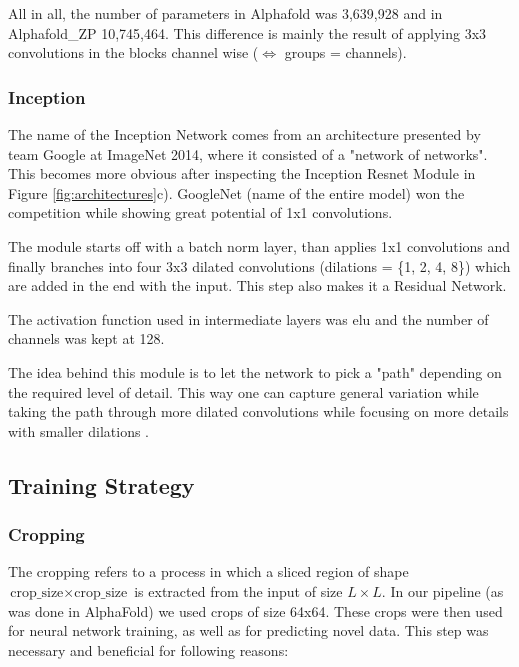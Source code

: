 All in all, the number of parameters in Alphafold was 3,639,928 and in Alphafold\_ZP 10,745,464. This difference is mainly the result of applying 3x3 convolutions in the blocks channel wise ($\Longleftrightarrow$ groups = channels).

\subsubsection{Inception}

The name of the Inception Network %
comes from an architecture presented by team Google at ImageNet 2014, where it consisted of a "network of networks".
This becomes more obvious after inspecting the Inception Resnet Module in Figure \ref{fig:architectures}c). GoogleNet (name of the entire model) won the competition while showing great potential of 1x1 convolutions.

The module starts off with a batch norm layer, than applies 1x1 convolutions and finally branches into four 3x3 dilated convolutions (dilations = \{1, 2, 4, 8\}) which are added in the end with the input. This step also makes it a Residual Network.

The activation function used in intermediate layers was elu and the number of channels was kept at 128.

The idea behind this module is to let the network to pick a "path" depending on the required level of detail. This way one can capture general variation while taking the path through more dilated convolutions while focusing on more details with smaller dilations \cite{nn_dl}.

\subsection{Training Strategy}

\subsubsection{Cropping}

The cropping refers to a process in which %
a sliced region of shape $\text{crop\_size} \times \text{crop\_size}$ is extracted from the input of size $L \times L$. In our pipeline (as was done in AlphaFold) we used crops of size 64x64.
These crops were then used for neural network training, as well as for predicting novel data. This step was necessary and beneficial for following reasons: 

